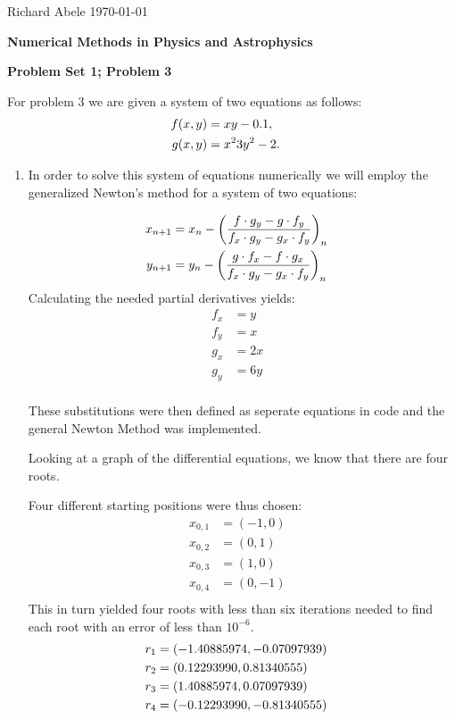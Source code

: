 \documentclass[12pt]{article}
\DeclarePairedDelimiter\rb{(}{)}
\begin{document}
\noindent Richard Abele \hfill \today \\[30pt]
\centerline{ \Large{ \textbf{ Numerical Methods in Physics and Astrophysics }}}
\centerline{ \Large{ \textbf{ Problem Set 1; Problem 3 }}}

For problem 3 we are given a system of two equations as follows: 
\begin{align*}
	f \rb*{x,y} & =  x y  - 0.1 ,&\\
	g \rb*{ x, y } & = x^{2}  3 y^{2} - 2 .&\\
\end{align*}

\begin{enumerate}
	\item 
In order to solve this system of equations numerically we will employ the generalized Newton's method for a system of two equations: 

\begin{align*}
	x_{n+1} & =  x_{n} - \rb*{ \frac{f \cdot g_{y} - g \cdot f_{y}}{
			f_{x} \cdot g_{y} - g_{x} \cdot f_{y}
	}}_{n} &\\
	y_{n+1} & =  y_{n} - 
	\rb*{\frac{g \cdot f_{x} - f \cdot g_{x}}{
			f_{x} \cdot g_{y} - g_{x} \cdot f_{y}
	}}_{n} &\\
\end{align*}
Calculating the needed partial derivatives yields: 
\begin{align*}
	f_{x} & =  y &\\
	f_{y} & =  x &\\
	g_{x} & =  2 x &\\
	g_{y} & =  6 y &\\
\end{align*}

These substitutions were then defined as seperate equations in code and the general Newton Method was implemented. 

Looking at a graph of the differential equations, we know that there are four roots. 

Four different starting positions were thus chosen:
\begin{align*}
	x_{0,1} & =  (-1,0) &\\
	x_{0,2} & =  (0 , 1) &\\
	x_{0,3} & =  (1, 0) &\\
	x_{0,4} & =  (0 , -1) &\\
\end{align*}
This in turn yielded four roots with less than six iterations needed to find each root with an error of less than \(10^{-6}\). 
\begin{align*}
	r_{1} & =  \rb*{-1.40885974, -0.07097939} &\\
	r_{2} & =  \rb*{0.12293990, 0.81340555} &\\
	r_{3} & =  \rb*{1.40885974, 0.07097939} &\\
	r_{4} & =  \rb*{-0.12293990, -0.81340555} &\\
\end{align*}


\end{enumerate}
\end{document}
